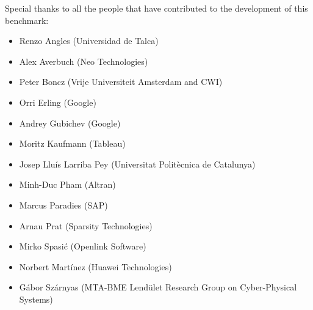 Special thanks to all the people that have contributed to the development of
this benchmark:
\begin{itemize}
  \item Renzo Angles (Universidad de Talca)
  \item Alex Averbuch (Neo Technologies)
  \item Peter Boncz (Vrije Universiteit Amsterdam and CWI)
  \item Orri Erling (Google)
  \item Andrey Gubichev (Google)
  \item Moritz Kaufmann (Tableau)
  \item Josep Llu\'is Larriba Pey (Universitat Polit\`ecnica de Catalunya)
  \item Minh-Duc Pham (Altran)
  \item Marcus Paradies (SAP)
  \item Arnau Prat (Sparsity Technologies)
  \item Mirko Spasi\'c (Openlink Software)
  \item Norbert Mart\'inez (Huawei Technologies)
  \item G\'abor Sz\'arnyas (MTA-BME Lend\"ulet Research Group on Cyber-Physical Systems)
\end{itemize}
